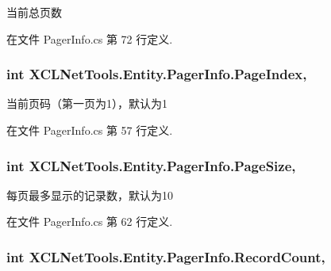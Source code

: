 当前总页数 



在文件 Pager\-Info.\-cs 第 72 行定义.

\hypertarget{class_x_c_l_net_tools_1_1_entity_1_1_pager_info_a2cd0abb6744c59bbd9b98c758a023ac5}{
\subsubsection[{Page\-Index}]{\setlength{\rightskip}{0pt plus 5cm}int X\-C\-L\-Net\-Tools.\-Entity.\-Pager\-Info.\-Page\-Index\hspace{0.3cm}{\ttfamily [get]}, {\ttfamily [set]}}}\label{class_x_c_l_net_tools_1_1_entity_1_1_pager_info_a2cd0abb6744c59bbd9b98c758a023ac5}


当前页码（第一页为1），默认为1 



在文件 Pager\-Info.\-cs 第 57 行定义.

\hypertarget{class_x_c_l_net_tools_1_1_entity_1_1_pager_info_af9b5f737263571d79ead065f6faaa5ca}{
\subsubsection[{Page\-Size}]{\setlength{\rightskip}{0pt plus 5cm}int X\-C\-L\-Net\-Tools.\-Entity.\-Pager\-Info.\-Page\-Size\hspace{0.3cm}{\ttfamily [get]}, {\ttfamily [set]}}}\label{class_x_c_l_net_tools_1_1_entity_1_1_pager_info_af9b5f737263571d79ead065f6faaa5ca}


每页最多显示的记录数，默认为10 



在文件 Pager\-Info.\-cs 第 62 行定义.

\hypertarget{class_x_c_l_net_tools_1_1_entity_1_1_pager_info_a5617d4aaafa80fa664f13cfe7fbc1a6c}{
\subsubsection[{Record\-Count}]{\setlength{\rightskip}{0pt plus 5cm}int X\-C\-L\-Net\-Tools.\-Entity.\-Pager\-Info.\-Record\-Count\hspace{0.3cm}{\ttfamily [get]}, {\ttfamily [set]}}}\label{class_x_c_l_net_tools_1_1_entity_1_1_pager_info_a5617d4aaafa80fa664f13cfe7fbc1a6c}


